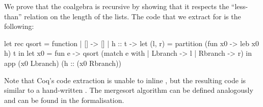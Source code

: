 \documentclass[ a4paper, UKenglish, cleveref, autoref, thm-restate]{lipics-v2021}
\begin{document}
We prove that the coalgebra  is recursive by showing
that it respects the ``less-than'' relation on the length of the lists.
%
The code that we extract for  is the following:
\begin{ocamlcode}
let rec qsort = function
| [] -> [] | h :: t ->
  let (l, r) = partition (fun x0 -> leb x0 h) t in
  let x0 = fun e -> qsort (match e with | Lbranch -> l | Rbranch -> r) in
  app (x0 Lbranch) (h :: (x0 Rbranch))
\end{ocamlcode}
Note that Coq's code extraction is unable to inline , but the resulting
code is similar to a hand-written .
The mergesort algorithm can be defined analogously and can be found in the
formalisation. %



\end{document}
